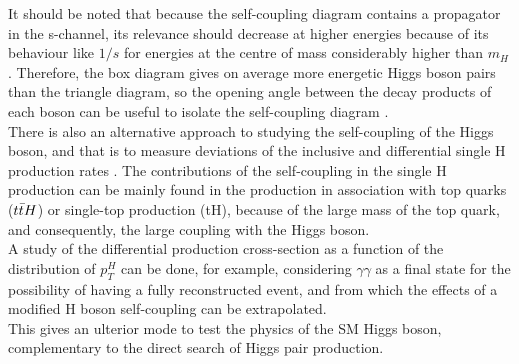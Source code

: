 It should be noted that because the self-coupling diagram contains a propagator in the s-channel, its relevance should decrease at higher energies because of its behaviour like $1/s$ for energies at the centre of mass considerably higher than $m_H$. Therefore, the box diagram gives on average more energetic Higgs boson pairs than the triangle diagram, so the opening angle between the decay products of each boson can be useful to isolate the self-coupling diagram \cite{theo_pair}.\\
There is also an alternative approach to studying the self-coupling of the Higgs boson, and that is to measure deviations of the inclusive and differential single H production rates \cite{HL-LHC_Higgs}. The contributions of the self-coupling in the single H production can be mainly found in the production in association with top quarks ($t\Bar{t}H$) or single-top production (tH), because of the large mass of the top quark, and consequently, the large coupling with the Higgs boson.\\
A study of the differential production cross-section as a function of the distribution of $p_T^H$ can be done, for example, considering $\gamma\gamma$ as a final state for the possibility of having a fully reconstructed event, and from which the effects of a modified H boson self-coupling can be extrapolated.\\
This gives an ulterior mode to test the physics of the SM Higgs boson, complementary to the direct search of Higgs pair production.
